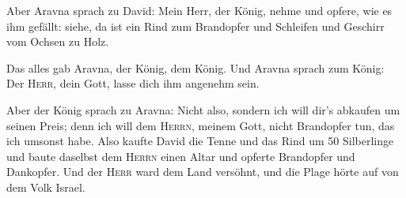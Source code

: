  Aber Aravna sprach zu David: Mein Herr, der König, nehme
und opfere, wie es ihm gefällt: siehe, da ist ein Rind zum Brandopfer
und Schleifen und Geschirr vom Ochsen zu Holz.

 Das alles gab Aravna, der König, dem König. Und Aravna
sprach zum König: Der \textsc{Herr}, dein Gott, lasse dich ihm angenehm
sein.

 Aber der König sprach zu Aravna: Nicht also, sondern ich
will dir's abkaufen um seinen Preis; denn ich will dem \textsc{Herrn},
meinem Gott, nicht Brandopfer tun, das ich umsonst habe. Also kaufte
David die Tenne und das Rind um 50 Silberlinge  und baute
daselbst dem \textsc{Herrn} einen Altar und opferte Brandopfer und
Dankopfer. Und der \textsc{Herr} ward dem Land versöhnt, und die Plage
hörte auf von dem Volk Israel.
